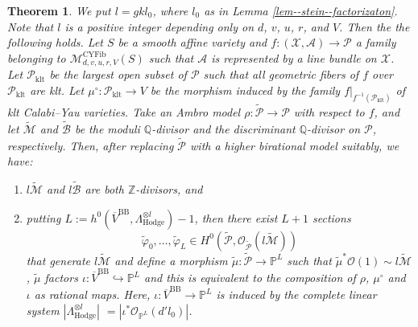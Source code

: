 \documentclass[10pt,a4paper]{amsart}
\newtheorem{thm}{Theorem}
\begin{document}
\begin{thm}\label{thm--Fujino's--period--mapping--theory}
    We put $l=gkl_0$, where $l_0$ as in Lemma \ref{lem--stein--factorizaton}. 
    Note that $l$ is a positive integer depending only on $d$, $v$, $u$, $r$, and $V$. 
    Then the the following holds.
    Let $S$ be a smooth affine variety and $f\colon (\mathcal{X},\mathcal{A})\to\mathcal{P}$ a family belonging to $\mathcal{M}_{d,v,u,r,V}^{\mathrm{CYFib}}(S)$ such that $\mathcal{A}$ is represented by a line bundle on $\mathcal{X}$.
    Let $\mathcal{P}_{\mathrm{klt}}$ be the largest open subset of $\mathcal{P}$ such that all geometric fibers of $f$ over $\mathcal{P}_{\mathrm{klt}}$ are klt. 
    Let $\mu^\circ\colon \mathcal{P}_{\mathrm{klt}}\to V$ be the morphism induced by the family $f|_{f^{-1}(\mathcal{P}_{\mathrm{klt}})}$ of klt Calabi--Yau varieties. 
    Take an Ambro model $\rho\colon\widetilde{\mathcal{P}}\to \mathcal{P}$ with respect to $f$, and let $\widetilde{\mathcal{M}}$ and $\widetilde{\mathcal{B}}$ be the moduli $\mathbb{Q}$-divisor and the discriminant $\mathbb{Q}$-divisor on $\mathcal{P}$, respectively.
    Then, after replacing $\widetilde{\mathcal{P}}$ with a higher birational model suitably, we have:
    \begin{enumerate}
       \item \label{thm--Fujino's--period--mapping--theory-(1)} $l\widetilde{\mathcal{M}}$ and $l\widetilde{\mathcal{B}}$ are both $\mathbb{Z}$-divisors, and
        \item \label{thm--Fujino's--period--mapping--theory-(2)} putting $L:=h^0(\overline{V}^{\mathrm{BB}},\Lambda^{\otimes l}_{\mathrm{Hodge}})-1$, then there exist $L+1$ sections $$\widetilde{\varphi}_0,\ldots,\widetilde{\varphi}_L\in H^0(\widetilde{\mathcal{P}},\mathcal{O}_{\widetilde{\mathcal{P}}}(l\widetilde{\mathcal{M}}))$$ that generate $l\widetilde{\mathcal{M}}$ and define a morphism $\widetilde{\mu}\colon\widetilde{\mathcal{P}}\to \mathbb{P}^L$ such that $\widetilde{\mu}^*\mathcal{O}(1)\sim l\widetilde{\mathcal{M}}$, $\widetilde{\mu}$ factors $\iota\colon \overline{V}^{\mathrm{BB}}\hookrightarrow \mathbb{P}^L$ and this is equivalent to the composition of  $\rho$, $\mu^\circ$ and $\iota$ as rational maps.  
        Here, $\iota\colon \overline{V}^{\mathrm{BB}}\to \mathbb{P}^L$ is induced by the complete linear system $|\Lambda^{\otimes l}_{\mathrm{Hodge}}|$ $=|\iota^*\mathcal{O}_{\mathbb{P}^L}(d'l_{0})|$. 
    \end{enumerate}
\end{thm}
\end{document}
